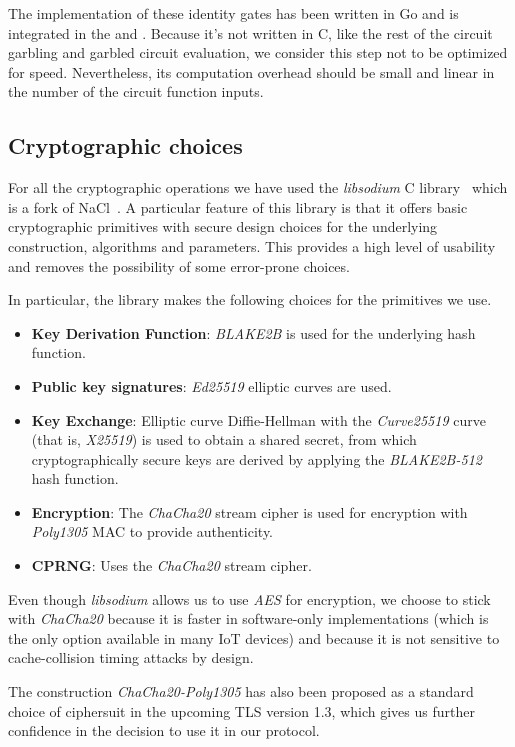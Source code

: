 The implementation of these identity gates has been written in Go and is
integrated in the \broker and \garbler.  Because it's not written in C, like
the rest of the circuit garbling and garbled circuit evaluation, we consider
this step not to be optimized for speed.  Nevertheless, its computation
overhead should be small and linear in the number of the circuit function
inputs.


\subsection{Cryptographic choices}

For all the cryptographic operations we have used the \emph{libsodium} C
library~\cite{libsodium} which is a fork of NaCl~\cite{nacl}.  A particular
feature of this library is that it offers basic cryptographic primitives with
secure design choices for the underlying construction, algorithms and
parameters.  This provides a high level of usability and removes the
possibility of some error-prone choices.

In particular, the library makes the following choices for the primitives we use.

\begin{itemize}
  \item \textbf{Key Derivation Function}: \emph{BLAKE2B} is used for the
    underlying hash function.
  \item \textbf{Public key signatures}: \emph{Ed25519} elliptic curves are used.
  \item \textbf{Key Exchange}: Elliptic curve Diffie-Hellman with the
    \emph{Curve25519} curve (that is, \emph{X25519}) is used to obtain a shared
    secret, from which cryptographically secure keys are derived by applying
    the \emph{BLAKE2B-512} hash function.
  \item \textbf{Encryption}: The \emph{ChaCha20} stream cipher is used for
    encryption with \emph{Poly1305} MAC to provide authenticity.
  \item \textbf{CPRNG}: Uses the \emph{ChaCha20} stream cipher.
\end{itemize}

Even though \emph{libsodium} allows us to use \emph{AES} for encryption, we
choose to stick with \emph{ChaCha20} because it is faster in software-only
implementations (which is the only option available in many IoT devices) and
because it is not sensitive to cache-collision timing attacks by design.

The construction \emph{ChaCha20-Poly1305} has also been proposed as a standard
choice of ciphersuit in the upcoming TLS version 1.3, which gives us further
confidence in the decision to use it in our protocol.

